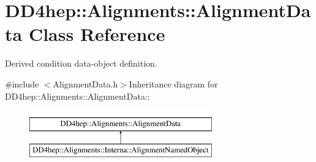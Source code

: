 \hypertarget{class_d_d4hep_1_1_alignments_1_1_alignment_data}{
\section{DD4hep::Alignments::AlignmentData Class Reference}
\label{class_d_d4hep_1_1_alignments_1_1_alignment_data}
}


Derived condition data-\/object definition.  


{\ttfamily \#include $<$AlignmentData.h$>$}Inheritance diagram for DD4hep::Alignments::AlignmentData::\begin{figure}[H]
\begin{center}
\leavevmode
\includegraphics[height=2cm]{class_d_d4hep_1_1_alignments_1_1_alignment_data}
\end{center}
\end{figure}
